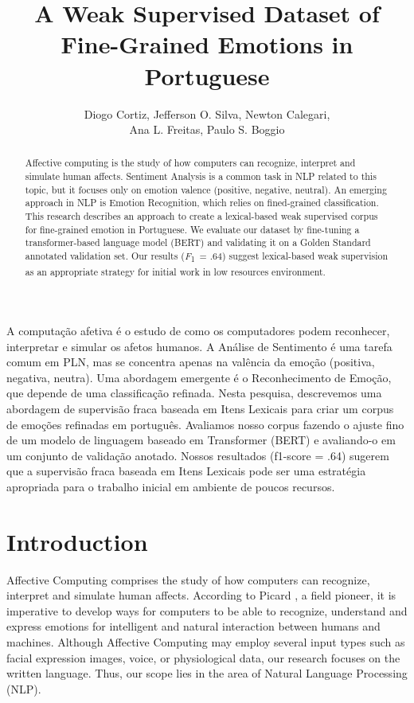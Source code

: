 \documentclass[12pt]{article}
\title{A Weak Supervised Dataset of Fine-Grained Emotions in Portuguese}
\author{Diogo Cortiz\inst{1,2}, Jefferson O. Silva\inst{2}, Newton Calegari\inst{2}, \\

Ana L. Freitas\inst{3}, Paulo S. Boggio\inst{3}}
\newcommand{\F}{\textit{F}\textsubscript{1}}
\begin{document}
\maketitle

\begin{abstract}
Affective computing is the study of how computers can recognize, interpret and simulate human affects. Sentiment Analysis is a common task in NLP related to this topic, but it focuses only on emotion valence (positive, negative, neutral). An emerging approach in NLP is Emotion Recognition, which relies on fined-grained classification. This research describes an approach to create a lexical-based weak supervised corpus for fine-grained emotion in Portuguese. We evaluate our dataset by fine-tuning a transformer-based language model (BERT) and validating it on a Golden Standard annotated validation set. Our results (\F~= $.64$) suggest lexical-based weak supervision as an appropriate strategy for initial work in low resources environment.
\end{abstract}

\begin{resumo}
A computação afetiva é o estudo de como os computadores podem reconhecer, interpretar e simular os afetos humanos. A Análise de Sentimento é uma tarefa comum em PLN, mas se concentra apenas na valência da emoção (positiva, negativa, neutra). Uma abordagem emergente é o Reconhecimento de Emoção, que depende de uma classificação refinada. Nesta pesquisa, descrevemos uma abordagem de supervisão fraca baseada em Itens Lexicais para criar um corpus de emoções refinadas em português. Avaliamos nosso corpus fazendo o ajuste fino de um modelo de linguagem baseado em Transformer (BERT) e avaliando-o em um conjunto de validação anotado. Nossos resultados (f1-score = .64) sugerem que a supervisão fraca baseada em Itens Lexicais pode ser uma estratégia apropriada para o trabalho inicial em ambiente de poucos recursos.

\end{resumo}


\section{Introduction}
\label{sec:introduction}

Affective Computing comprises the study of how computers can recognize, interpret and simulate human affects. According to Picard \cite{Rosalind2000}, a field pioneer, it is imperative to develop ways for computers to be able to recognize, understand and express emotions for intelligent and natural interaction between humans and machines. Although Affective Computing may employ several input types such as facial expression images, voice, or physiological data, our research focuses on the written language. Thus, our scope lies in the area of Natural Language Processing (NLP).
\end{document}

